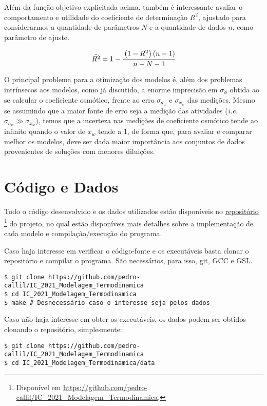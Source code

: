 \documentclass[
	12pt,				%
	openright,
	twoside,
	a4paper,			%
	brazil,			%
	french,				%
	spanish,			%
	english				%
	]{abntex2}
\begin{document}
Além da função objetivo explicitada acima, também é interessante avaliar o
comportamento e utilidade do coeficiente de determinação $R^2$, ajustado para
considerarmos a quantidade de parâmetros $N$ e a quantidade de dados $n$, como
parâmetro de ajuste.

\begin{equation}
	\bar{R^2} = 1 - \cfrac{\left( 1 - R^2 \right) \left( n - 1 \right)}
		{n - N - 1}
\end{equation}

O principal problema para a otimização dos modelos é, além dos problemas
intrínsecos aos modelos, como já discutido, a enorme imprecisão em
$\sigma_\phi$ obtida ao se calcular o coeficiente osmótico, frente ao erro
$\sigma_{a_w}$ e $\sigma_{x_w}$ das medições. Mesmo se assumindo que a maior
fonte de erro seja a medição das atividades (\textit{i.e.} $\sigma_{a_w} \gg
\sigma_{x_w}$), temos que a incerteza nas medições de coeficiente osmótico
tende ao infinito quando o valor de $x_w$ tende a 1, de forma que, para avaliar
e comparar melhor os modelos, deve ser dada maior importância aos conjuntos
de dados provenientes de soluções com menores diluições.

\chapter{Código e Dados}

Todo o código desenvolvido e os dados utilizados estão disponíveis no
\href{https://github.com/pedro-callil/IC_2021_Modelagem_Termodinamica}{repositório}
\footnote{Disponível em
	\url{https://github.com/pedro-callil/IC_2021_Modelagem_Termodinamica}.}
do projeto, no qual estão disponíveis mais detalhes sobre a implementação de
cada modelo e compilação/execução do programa.

Caso haja interesse em verificar o código-fonte e os executáveis basta clonar o
repositório e compilar o programa. São necessários, para isso, git, GCC e GSL.

\begin{verbatim}
$ git clone https://github.com/pedro-callil/IC_2021_Modelagem_Termodinamica
$ cd IC_2021_Modelagem_Termodinamica
$ make # Desnecessário caso o interesse seja pelos dados
\end{verbatim}

Caso não haja interesse em obter os executáveis, os dados podem ser obtidos
clonando o repositório, simplesmente:

\begin{verbatim}
$ git clone https://github.com/pedro-callil/IC_2021_Modelagem_Termodinamica
$ cd IC_2021_Modelagem_Termodinamica/data
\end{verbatim}
\end{document}
